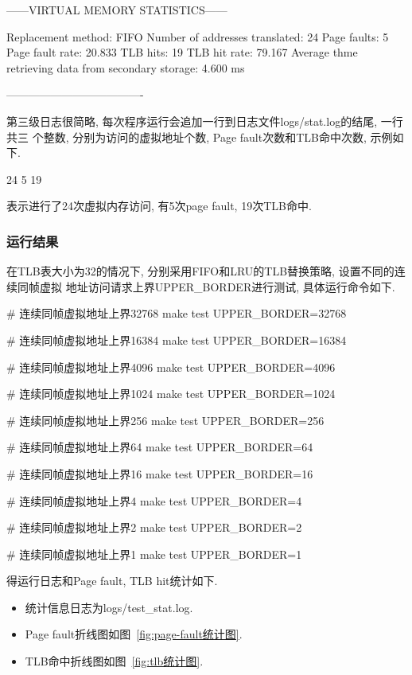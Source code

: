 \begin{code}
    ------VIRTUAL MEMORY STATISTICS------

    Replacement method: FIFO
    Number of addresses translated: 24
    Page faults: 5
    Page fault rate: 20.833%
    TLB hits: 19
    TLB hit rate: 79.167%
    Average thme retrieving data from secondary storage: 4.600 ms

    -------------------------------------

\end{code}

第三级日志很简略, 每次程序运行会追加一行到日志文件logs/stat.log的结尾, 一行共三
个整数, 分别为访问的虚拟地址个数, Page fault次数和TLB命中次数, 示例如下.
\begin{code}
    24 5 19
\end{code}
表示进行了24次虚拟内存访问, 有5次page fault, 19次TLB命中.

\subsubsection{运行结果}
在TLB表大小为32的情况下, 分别采用FIFO和LRU的TLB替换策略, 设置不同的连续同帧虚拟
地址访问请求上界UPPER\_BORDER进行测试, 具体运行命令如下.
\begin{code}
    # 连续同帧虚拟地址上界32768
    make test UPPER_BORDER=32768

    # 连续同帧虚拟地址上界16384
    make test UPPER_BORDER=16384

    # 连续同帧虚拟地址上界4096
    make test UPPER_BORDER=4096

    # 连续同帧虚拟地址上界1024
    make test UPPER_BORDER=1024

    # 连续同帧虚拟地址上界256
    make test UPPER_BORDER=256

    # 连续同帧虚拟地址上界64
    make test UPPER_BORDER=64

    # 连续同帧虚拟地址上界16
    make test UPPER_BORDER=16

    # 连续同帧虚拟地址上界4
    make test UPPER_BORDER=4

    # 连续同帧虚拟地址上界2
    make test UPPER_BORDER=2

    # 连续同帧虚拟地址上界1
    make test UPPER_BORDER=1
\end{code}

得运行日志和Page fault, TLB hit统计如下.
\begin{itemize}
    \item 统计信息日志为logs/test\_stat.log.
    \item Page fault折线图如图~\ref{fig:page-fault统计图}.
    \item TLB命中折线图如图~\ref{fig:tlb统计图}.
\end{itemize}

